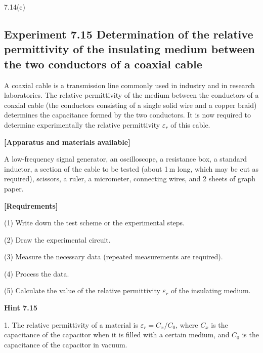 \begin{figbox}{7.14(c)}
\end{figbox}

\subsection*{Experiment 7.15 \quad Determination of the relative permittivity of the insulating medium between the two conductors of a coaxial cable}

A coaxial cable is a transmission line commonly used in industry and in research laboratories. The relative permittivity of the medium between the conductors of a coaxial cable (the conductors consisting of a single solid wire and a copper braid) determines the capacitance formed by the two conductors. It is now required to determine experimentally the relative permittivity $\varepsilon_r$ of this cable.

\textbf{[Apparatus and materials available]}

A low-frequency signal generator, an oscilloscope, a resistance box, a standard inductor, a section of the cable to be tested (about 1\,m long, which may be cut as required), scissors, a ruler, a micrometer, connecting wires, and 2 sheets of graph paper.

\textbf{[Requirements]}

(1) Write down the test scheme or the experimental steps.

(2) Draw the experimental circuit.

(3) Measure the necessary data (repeated measurements are required).

(4) Process the data.

(5) Calculate the value of the relative permittivity $\varepsilon_r$ of the insulating medium.

\textbf{Hint 7.15}

1. The relative permittivity of a material is $\varepsilon_r=C_x/C_0$, where $C_x$ is the capacitance of the capacitor when it is filled with a certain medium, and $C_0$ is the capacitance of the capacitor in vacuum.

